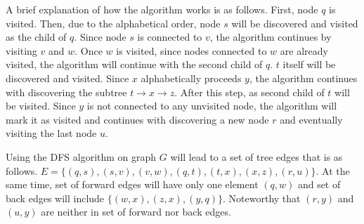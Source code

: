 A brief explanation of how the algorithm works is as follows.
First, node $q$ is visited.
Then, due to the alphabetical order, node $s$ will be discovered and visited as the child of $q$.
Since node $s$ is connected to $v$, the algorithm continues by visiting $v$ and $w$.
Once $w$ is visited, since nodes connected to $w$ are already visited, the algorithm will continue with the second child of $q$.
$t$ itself will be discovered and visited.
Since $x$ alphabetically proceeds $y$, the algorithm continues with discovering the subtree $t \rightarrow x \rightarrow z$.
After this step, as second child of $t$ will be visited.
Since $y$ is not connected to any unvisited node, the algorithm will mark it as visited and continues with discovering a new node $r$ and eventually visiting the last node $u$.

Using the DFS algorithm on graph $G$ will lead to a set of tree edges that is as follows.
$E = \{(q,s), (s,v), (v,w), (q,t), (t,x), (x,z), (r,u)\}$.
At the same time, set of forward edges will have only one element $(q,w)$ and set of back edges will include $\{(w,x), (z,x), (y,q)\}$.
Noteworthy that $(r,y)$ and $(u,y)$ are neither in set of forward nor back edges.

